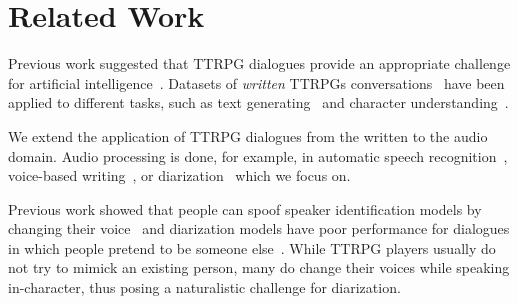 \section{Related Work}
Previous work suggested that TTRPG dialogues provide an appropriate challenge for artificial intelligence~\cite{ellis2017computers,martin2018dungeons}.
Datasets of \textit{written} TTRPGs conversations~\cite{callison2022dungeons,louis2018deep,rameshkumar2020storytelling} have been applied to different tasks, such as text generating~\cite{callison2022dungeons,newman2022generating,si2021telling} and character understanding~\cite{louis2018deep}.

We extend the application of TTRPG dialogues from the written to the audio domain. Audio processing is done, for example, in automatic speech recognition~\cite{huang2023mclf}, voice-based writing~\cite{goswami2023weakly}, or diarization~\cite{qamar2023speaking,qasemi2021paco} which we focus on.

Previous work showed that people can spoof speaker identification models by changing their voice~\cite{lau2004vulnerability,lau2005testing} and diarization models have poor performance for dialogues in which people pretend to be someone else~\cite{medaramitta2021evaluating}.
While TTRPG players usually do not try to mimick an existing person, many do change their voices while speaking in-character, thus posing a naturalistic challenge for diarization. %